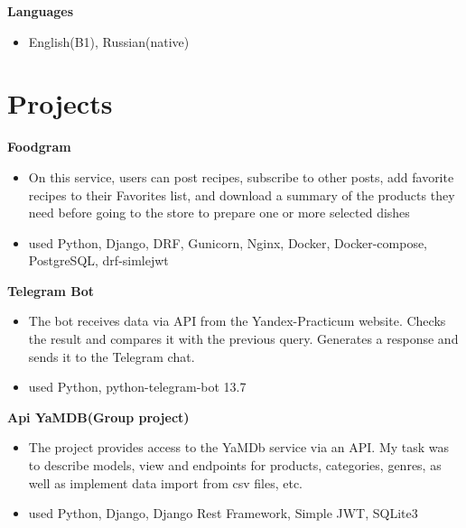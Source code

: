 \documentclass{clean_cv}
\begin{document}
\textbf{Languages}
 \begin{itemize}
   \item English(B1), Russian(native)
   \end{itemize}
   \vspace{0.5cm}
\section{Projects}

\textbf{Foodgram}\href{https://github.com/Chinpakamon/foodgram-project-react}{\color{blue}}
 \begin{itemize}
   \item  On this service, users can post recipes, subscribe to other posts, add favorite recipes to their Favorites list, and download a summary of the products they need before going to the store to prepare one or more selected dishes
   \item used Python, Django, DRF, Gunicorn, Nginx, Docker, Docker-compose, PostgreSQL, drf-simlejwt
   \end{itemize}
   \vspace{0.5cm}
   
   \textbf{Telegram Bot}\href{https://github.com/Chinpakamon/homework_bot}{\color{blue}}
 \begin{itemize}
   \item  The bot receives data via API from the Yandex-Practicum website. Checks the result and compares it with the previous query. Generates a response and sends it to the Telegram chat.
   \item used Python, python-telegram-bot 13.7
   \end{itemize}
   \vspace{0.5cm}
   
   \textbf{Api YaMDB(Group project)}\href{https://github.com/Chinpakamon/api_yamdb/tree/master}{\color{blue}}
 \begin{itemize}
   \item  The project provides access to the YaMDb service via an API. My task was to describe models, view and endpoints for products, categories, genres, as well as implement data import from csv files, etc.
   \item used Python, Django, Django Rest Framework, Simple JWT, SQLite3
   \end{itemize}
\end{document}
